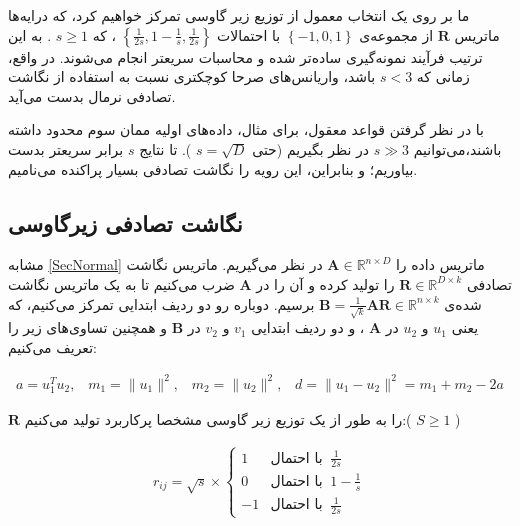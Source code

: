 ما بر روی یک انتخاب معمول از توزیع زیر گاوسی تمرکز خواهیم کرد، که درایه‌ها ماتریس 
$\mathbf{R}$
از مجموعه‌ی 
$\left\{ -1, 0, 1 \right\}$
با احتمالات 
$\left\{ \frac{1}{2s}, 1 - \frac{1}{s}, \frac{1}{2s} \right\}$
، که 
$s \geq 1$
. به این ترتیب فرآیند نمونه‌گیری ساده‌تر شده و محاسبات سریعتر انجام می‌شوند. در واقع، زمانی که 
$s < 3$
باشد، واریانس‌های صرحا کوچکتری نسبت به استفاده از نگاشت تصادفی نرمال بدست می‌آید.

با در نظر گرفتن قواعد معقول، برای مثال، داده‌های اولیه ممان سوم محدود داشته باشند،می‌توانیم 
$s \gg 3$
در نظر بگیریم (حتی 
$s = \sqrt{D}$
).
تا نتایج 
$s$
برابر سریعتر بدست بیاوریم؛ و بنابراین، این رویه را نگاشت تصادفی بسیار پراکنده می‌نامیم.


\subsection{
نگاشت تصادفی زیرگاوسی
}

مشابه
\autoref{SecNormal}
ماتریس داده را 
$\mathbf{A} \in \mathbb{R}^{n \times D}$
در نظر می‌گیریم. ماتریس نگاشت تصادفی 
$\mathbf{R} \in \mathbb{R}^{D \times k}$
را تولید کرده و آن را در 
$\mathbf{A}$
ضرب می‌کنیم تا به یک ماتریس نگاشت شده‌‌ی 
$\mathbf{B} = \frac{1}{\sqrt{k}} \mathbf{AR} \in \mathbb{R}^{n \times k}$
برسیم. دوباره رو دو ردیف ابتدایی تمرکز می‌کنیم، که یعنی 
$u_1$
و 
$u_2$
در 
$\mathbf{A}$
، و دو ردیف ابتدایی 
$v_1$
و 
$v_2$
در 
$\mathbf{B}$
و همچنین تساوی‌های زیر را تعریف می‌کنیم:

\begin{align}
a = u_1^T u_2, \;\;\; m_1 = \| u_1 \|^2, \;\;\; m_2 = \| u_2 \|^2, \;\;\;
d = \| u_1 - u_2 \|^2 = m_1 + m_2 - 2a
\label{eq:1iL}
\end{align}

$\mathbf{R}$
را به طور 
از یک توزیع زیر گاوسی مشخصا پرکاربرد تولید می‌کنیم:(
$S \geq 1$
)

\begin{align}
r_{ij} = \sqrt{s} \times 
\begin{cases}
1 & \text{با احتمال} \;\; \frac{1}{2s}\\
0 & \text{با احتمال} \;\; 
1-\frac{1}{s}\\
-1 & \text{با احتمال} \;\; \frac{1}{2s}
\end{cases} 
\label{eq:1iM}
\end{align}

